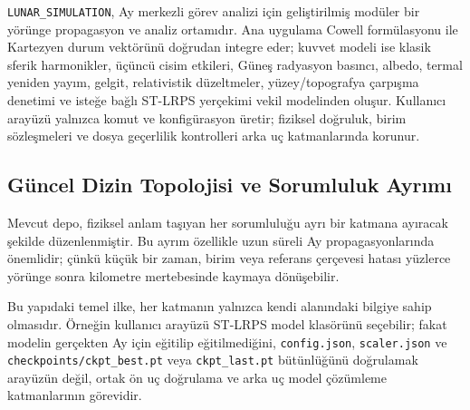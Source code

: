 \begin{tcolorbox}[
    colback=blue!3!black!2,
    colframe=blue!45!black,
    title={Güncel Mimari Özeti},
    fonttitle=\bfseries,
    sharp corners=south,
    boxrule=0.5pt
]
\texttt{LUNAR\_SIMULATION}, Ay merkezli görev analizi için geliştirilmiş modüler bir yörünge propagasyon ve analiz ortamıdır. Ana uygulama Cowell formülasyonu ile Kartezyen durum vektörünü doğrudan integre eder; kuvvet modeli ise klasik sferik harmonikler, üçüncü cisim etkileri, Güneş radyasyon basıncı, albedo, termal yeniden yayım, gelgit, relativistik düzeltmeler, yüzey/topografya çarpışma denetimi ve isteğe bağlı ST-LRPS yerçekimi vekil modelinden oluşur. Kullanıcı arayüzü yalnızca komut ve konfigürasyon üretir; fiziksel doğruluk, birim sözleşmeleri ve dosya geçerlilik kontrolleri arka uç katmanlarında korunur.
\end{tcolorbox}

\subsection{Güncel Dizin Topolojisi ve Sorumluluk Ayrımı}

Mevcut depo, fiziksel anlam taşıyan her sorumluluğu ayrı bir katmana ayıracak şekilde düzenlenmiştir. Bu ayrım özellikle uzun süreli Ay propagasyonlarında önemlidir; çünkü küçük bir zaman, birim veya referans çerçevesi hatası yüzlerce yörünge sonra kilometre mertebesinde kaymaya dönüşebilir.

\medskip
{}

\medskip
Bu yapıdaki temel ilke, her katmanın yalnızca kendi alanındaki bilgiye sahip olmasıdır. Örneğin kullanıcı arayüzü ST-LRPS model klasörünü seçebilir; fakat modelin gerçekten Ay için eğitilip eğitilmediğini, \texttt{config.json}, \texttt{scaler.json} ve \texttt{checkpoints/ckpt\_best.pt} veya \texttt{ckpt\_last.pt} bütünlüğünü doğrulamak arayüzün değil, ortak ön uç doğrulama ve arka uç model çözümleme katmanlarının görevidir.

